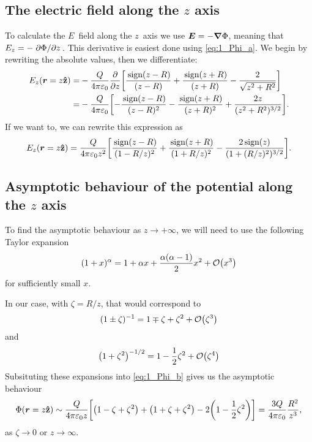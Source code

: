 \documentclass[11pt,letter, swedish, english
]{article}
\newcommand{\enaught}{\ensuremath\varepsilon_0}
\newcommand{\sign}{\ensuremath{\,\text{sign}}}
\begin{document}
\subsection{The electric field along the $z$ axis}
To calculate the $E$~field along the $z$~axis we use
$\vb*E=-\grad\Phi$, meaning that $E_z=-\pdv*{\Phi}{z}$. This
derivative is easiest done using \eqref{eq:1_Phi_a}. We begin by
rewriting the absolute values\footnotemark, then we differentiate:
\begin{equation}
\begin{aligned}
E_z(\vb*r=z\vu{z})=&
-\frac{Q}{4\pi\enaught} \pdv{z}\qty[
\frac{\sign(z-R)}{(z-R)} +\frac{\sign(z+R)}{(z+R)}
-\frac{2}{\sqrt{z^2+R^2}}]\\
=&-\frac{Q}{4\pi\enaught} \qty[
-\frac{\sign(z-R)}{(z-R)^2} -\frac{\sign(z+R)}{(z+R)^2}
+\frac{2z}{(z^2+R^2)^{3/2}}].
\end{aligned}
\end{equation}
If we want to, we can rewrite this expression as
\begin{equation}
E_z(\vb*r=z\vu{z})
=\frac{Q}{4\pi\enaught z^2} \qty[
\frac{\sign(z-R)}{(1-R/z)^2} +\frac{\sign(z+R)}{(1+R/z)^2}
-\frac{2\sign(z)}{(1+(R/z)^2)^{3/2}}].
\end{equation}


\subsection{Asymptotic behaviour of the potential along the $z$ axis}
To find the asymptotic behaviour as $z\to+\infty$, we will need to use
the following Taylor expansion
\begin{equation}
(1+x)^\alpha=1+\alpha x+\frac{\alpha(\alpha-1)}{2}x^2+\order{x^3}
\end{equation}
for sufficiently small $x$. 

In our case, with $\zeta=R/z$, that would correspond to
\begin{equation}
(1\pm\zeta)^{-1}=1\mp\zeta+\zeta^2+\order{\zeta^3}
\end{equation}
and
\begin{equation}
\qty(1+\zeta^2)^{-1/2}=1-\frac{1}{2}\zeta^2+\order{\zeta^4}
\end{equation}
Subsituting these expansions into \eqref{eq:1_Phi_b} gives us the
asymptotic behaviour
\begin{equation}
\Phi(\vb*r=z\vu{z})\sim
\frac{Q}{4\pi\enaught z}
\qty[\qty(1-\zeta+\zeta^2)+\qty(1+\zeta+\zeta^2)
-2\qty(1-\frac{1}{2}\zeta^2)]
=\frac{3Q}{4\pi\enaught}\frac{R^2}{z^3},
\end{equation}
as $\zeta\to0$ or $z\to\infty$.
\end{document}
